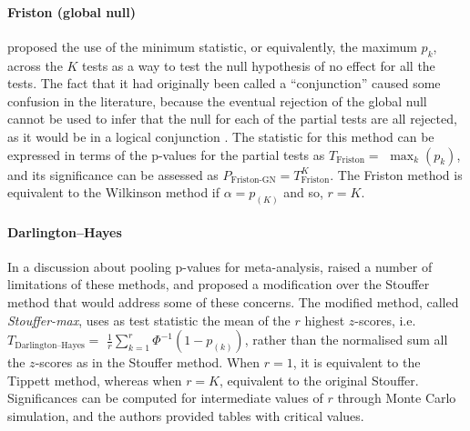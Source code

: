 \paragraph{Friston (global null)} \citet{Friston1999} proposed the use of the minimum statistic, or equivalently, the maximum $p_{k}$, across the $K$ tests as a way to test the null hypothesis of no effect for all the tests. The fact that it had originally been called a ``conjunction'' caused some confusion in the literature, because the eventual rejection of the global null cannot be used to infer that the null for each of the partial tests are all rejected, as it would be in a logical conjunction \citep{Nichols2005}. The statistic for this method can be expressed in terms of the p-values for the partial tests as $T_{\text{Friston}}=$ $\max_{k} \left(p_{k}\right)$, and its significance can be assessed as $P_{\text{Friston-GN}}=T^{K}_{\text{Friston}}$. The Friston method is equivalent to the Wilkinson method if $\alpha=p_{(K)}$ and so, $r=K$.

\paragraph{Darlington--Hayes} In a discussion about pooling p-values for meta-analysis, \citet{Darlington2000} raised a number of limitations of these methods, and proposed a modification over the Stouffer method that would address some of these concerns. The modified method, called \emph{Stouffer-max}, uses as test statistic the mean of the $r$ highest $z$-scores, i.e. $T_{\text{Darlington--Hayes}} =$ $\frac{1}{r} \sum_{k=1}^{r} \Phi^{-1}\left(1-p_{(k)}\right)$, rather than the normalised sum all the $z$-scores as in the Stouffer method. When $r=1$, it is equivalent to the Tippett method, whereas when $r=K$, equivalent to the original Stouffer. Significances can be computed for intermediate values of $r$ through Monte Carlo simulation, and the authors provided tables with critical values.

